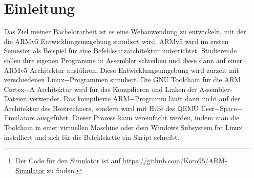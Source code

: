 \documentclass[a4paper, 11pt, onecolumn]{article}
\begin{document}


\newpage    
    
\begin{abstract}

Der ARM Simulator\footnote{Der Code für den Simulator ist auf \url{https://github.com/Koro95/ARM-Simulator} zu finden.} stellt eine ARMv5 Entwicklungsumgebung als Webanwendung zur Verfügung. Die Anwendung verwendet einen Parser basierend auf einer Parsing Expression Grammatik, mit dem die Benutzereingabe schnell und effizient analysiert werden kann. Der Code von Benutzer:innen wird anschließend in einen simulierten Hauptspeicher geschrieben und kann mit der Code Execution Engine, die auch als Debugger dient, ausgeführt werden. Mit dem Debugger kann dann der Code Zeile für Zeile oder bis zu bestimmten Breakpoints ausgeführt werden. Während der gesamten Ausführung wird dabei der Zustand der Register, des Statusregisters und des Hauptspeichers angezeigt. Der Inhalt der Register und des Hauptspeichers kann jederzeit von Benutzer:innen verändert werden. Diese Funktionen vereinfachen die Fehlersuche und das Debugging der Assembler Programme. Der Simulator ist in TypeScript geschrieben und benutzt das Webframework React als Frontend. React funktioniert in jedem modernen Browser und Benutzer:innen können, ohne Installation von zusätzlichen Programmen oder Tools, ihren ARMv5 Code direkt in ihrem Webbrowser ausführen und analysieren.



\end{abstract}

\newpage

\tableofcontents
\newpage
\listoffigures
\listoftables
\lstlistoflistings
\newpage

\setcounter{page}{1}

\section{Einleitung}

Das Ziel meiner Bachelorarbeit ist es eine Webanwendung zu entwickeln, mit der die ARMv5 Entwicklungsumgebung simuliert wird. ARMv5 \cite{arm:2005} wird im ersten Semester als Beispiel für eine Befehlssatzarchitektur unterrichtet. Studierende sollen ihre eigenen Programme in Assembler \cite{assembly} schreiben und diese dann auf einer ARMv5 Architektur ausführen. Diese Entwicklungsumgebung wird zurzeit mit verschiedenen Linux$-$Programmen simuliert. Die GNU Toolchain für die ARM Cortex$-$A Architektur \cite{gnutoolchain} wird für das Kompilieren und Linken der Assembler-Dateien verwendet. Das kompilierte ARM$-$Programm läuft dann nicht auf der Architektur des Hostrechners, sondern wird mit Hilfe des QEMU User$-$Space$-$Emulators \cite{qemu} ausgeführt. Dieser Prozess kann vereinfacht werden, indem man die Toolchain in einer virtuellen Maschine oder dem Windows Subsystem for Linux \cite{wsl} installiert und sich für die Befehlskette ein Skript schreibt.
\end{document}
